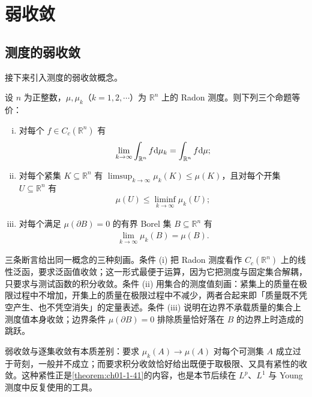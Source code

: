\documentclass[../../main.tex]{subfiles}%
\begin{document}
\section{弱收敛}\label{section:ch01-09}

\subsection{测度的弱收敛}\label{subsection:ch01-09-1}

接下来引入测度的弱收敛概念。

\begin{theorem}[测度的弱收敛]\label{theorem:ch01-1-40}
设 $n$ 为正整数，$\mu,\mu_k$（$k=1,2,\cdots$）为 $\mathbb{R}^n$ 上的 Radon 测度。则下列三个命题等价：
\begin{enumerate}[(i)]
\item 对每个 $f\in C_c(\mathbb{R}^n)$ 有
\begin{align*}
\lim_{k\to\infty}\int_{\mathbb{R}^n}f\mathrm{d}\mu_k=\int_{\mathbb{R}^n}f\mathrm{d}\mu;
\end{align*}
\item 对每个紧集 $K\subseteq\mathbb{R}^n$ 有 $\limsup_{k\to\infty}\mu_k(K)\leqslant\mu(K)$，且对每个开集 $U\subseteq\mathbb{R}^n$ 有
\begin{align*}
\mu(U)\leqslant\liminf_{k\to\infty}\mu_k(U);
\end{align*}
\item 对每个满足 $\mu(\partial B)=0$ 的有界 Borel 集 $B\subseteq\mathbb{R}^n$ 有
\begin{align*}
\lim_{k\to\infty}\mu_k(B)=\mu(B).
\end{align*}
\end{enumerate}
\end{theorem}

\begin{remark}\label{remark:ch01-thm-1-40-动机}
三条断言给出同一概念的三种刻画。条件 (i) 把 Radon 测度看作 $C_c(\mathbb{R}^n)$ 上的线性泛函，要求泛函值收敛；这一形式最便于运算，因为它把测度与固定集合解耦，只要求与测试函数的积分收敛。条件 (ii) 用集合的测度值刻画：紧集上的质量在极限过程中不增加，开集上的质量在极限过程中不减少，两者合起来即「质量既不凭空产生、也不凭空消失」的定量表述。条件 (iii) 说明在边界不承载质量的集合上测度值本身收敛；边界条件 $\mu(\partial B)=0$ 排除质量恰好落在 $B$ 的边界上时造成的跳跃。

弱收敛与逐集收敛有本质差别：要求 $\mu_k(A)\to\mu(A)$ 对每个可测集 $A$ 成立过于苛刻，一般并不成立；而要求积分收敛恰好给出既便于取极限、又具有紧性的收敛。这种紧性正是\cref{theorem:ch01-1-41}的内容，也是本节后续在 $L^p$、$L^1$ 与 Young 测度中反复使用的工具。%
\end{remark}
\end{document}
